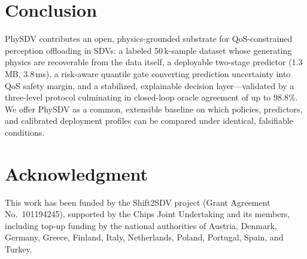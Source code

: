 \documentclass[10pt,conference]{IEEEtran}
\begin{document}
\section{Conclusion}\label{sec:conclusion}

PhySDV contributes an open, physics-grounded substrate for
QoS-constrained perception offloading in SDVs: a labeled 50\,k-sample
dataset whose generating physics are recoverable from the data itself,
a deployable two-stage predictor (1.3\,MB, 3.8\,ms), a risk-aware
quantile gate converting prediction uncertainty into QoS safety margin,
and a stabilized, explainable decision layer---validated by a
three-level protocol culminating in closed-loop oracle agreement of up
to 98.8\%.  We offer PhySDV as a common, extensible baseline on which
policies, predictors, and calibrated deployment profiles can be
compared under identical, falsifiable conditions.

\section*{Acknowledgment}

This work has been funded by the Shift2SDV project (Grant Agreement
No.~101194245), supported by the Chips Joint Undertaking and its members,
including top-up funding by the national authorities of Austria, Denmark,
Germany, Greece, Finland, Italy, Netherlands, Poland, Portugal, Spain, and
Turkey.
\end{document}
